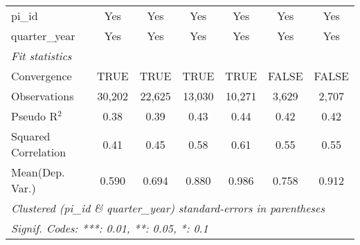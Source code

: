 \begin{tabular}{lcccccc}
   pi\_id                                                     & Yes           & Yes           & Yes           & Yes           & Yes           & Yes\\  
   quarter\_year                                              & Yes           & Yes           & Yes           & Yes           & Yes           & Yes\\  
   \midrule
   \emph{Fit statistics}\\
   Convergence                                                &TRUE           & TRUE          & TRUE          & TRUE          & FALSE         & FALSE\\  
   Observations                                               & 30,202        & 22,625        & 13,030        & 10,271        & 3,629         & 2,707\\  
   Pseudo R$^2$                                               & 0.38          & 0.39          & 0.43          & 0.44          & 0.42          & 0.42\\  
   Squared Correlation                                        & 0.41          & 0.45          & 0.58          & 0.61          & 0.55          & 0.55\\  
Mean(Dep. Var.) & 0.590 & 0.694 & 0.880 & 0.986 & 0.758 & 0.912 \\
   \midrule \midrule
   \multicolumn{7}{l}{\emph{Clustered (pi\_id \& quarter\_year) standard-errors in parentheses}}\\
   \multicolumn{7}{l}{\emph{Signif. Codes: ***: 0.01, **: 0.05, *: 0.1}}\\
\end{tabular}
\par\endgroup
